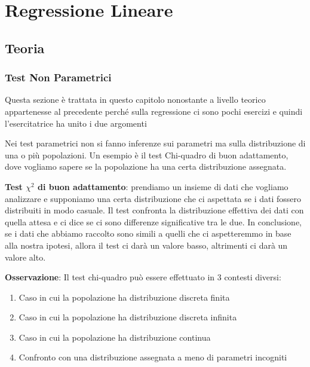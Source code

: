 \newcommand{\sxx}{\sum_{i=1}^n x_i^2 - n\overline{x}^2}
\newcommand{\sxy}{\sum_{i=1}^n x_i Y_i - n\overline{x}\overline{Y}}
\newcommand{\syy}{\sum_{i=1}^n Y_i^2 - n\overline{Y}^2}
\newcommand{\ssr}{\sum_{n=1}^n (Y_i - A - Bx_i)^2}

\chapter{Regressione Lineare}

\section{Teoria}

\subsection{Test Non Parametrici}

{\color{gray} Questa sezione è trattata in questo capitolo nonostante a livello teorico appartenesse al precedente perché sulla regressione ci sono pochi esercizi e quindi l'esercitatrice ha unito i due argomenti} \n

\ind Nei test parametrici non si fanno inferenze sui parametri ma sulla distribuzione di una o più popolazioni. Un esempio è il test Chi-quadro di buon adattamento, dove vogliamo sapere se la popolazione ha una certa distribuzione assegnata. \n

\ind \textbf{Test $\chi^2$ di buon adattamento}: prendiamo un insieme di dati che vogliamo analizzare e supponiamo una certa distribuzione che ci aspettata se i dati fossero distribuiti in modo casuale. Il test confronta la distribuzione effettiva dei dati con quella attesa e ci dice se ci sono differenze significative tra le due. In conclusione, se i dati che abbiamo raccolto sono simili a quelli che ci aspetteremmo in base alla nostra ipotesi, allora il test ci darà un valore basso, altrimenti ci darà un valore alto. \n

\ind \textbf{Osservazione}: Il test chi-quadro può essere effettuato in 3 contesti diversi:
\begin{enumerate}
    \item Caso in cui la popolazione ha distribuzione discreta finita
    \item Caso in cui la popolazione ha distribuzione discreta infinita
    \item Caso in cui la popolazione ha distribuzione continua
    \item Confronto con una distribuzione assegnata a meno di parametri incogniti
\end{enumerate}

